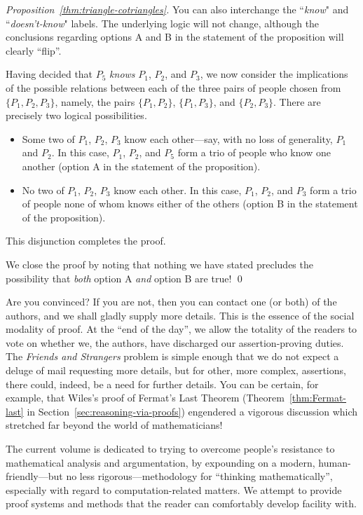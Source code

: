 \begin{proof}[Proposition~\ref{thm:triangle-cotriangles}]
{\begin{minipage}{0.96\textwidth}
You can also interchange the ``{\em know}" and ``{\em doesn't-know}" labels.  The underlying logic will not change, although the conclusions regarding options A and B in the statement of the proposition will clearly ``flip''.
\end{minipage} }

\bigskip

\noindent
Having decided that $P_5$ {\em knows} $P_1$, $P_2$, and $P_3$, we now consider the implications of the possible relations between each of the three pairs of people chosen from $\{P_1, P_2, P_3\}$, namely, the pairs  $\{P_1, P_2\}$, $\{P_1, P_3\}$, and $\{P_2, P_3\}$.  There
are precisely two logical possibilities.
\begin{itemize}
\item
Some two of $P_1$, $P_2$, $P_3$ know each other---say, with no loss of generality, $P_1$ and $P_2$.  In this case, $P_1$, $P_2$, and $P_5$ form a trio of people who know one another (option A in the statement of the proposition).
\item
No two of $P_1$, $P_2$, $P_3$ know each other.  In this case, $P_1$, $P_2$, and $P_3$ form a trio of people none of whom knows either of the others (option B in the statement of the proposition).
\end{itemize}
This disjunction completes the proof.

\smallskip

We close the proof by noting that nothing we have stated precludes the possibility that {\em both} option A {\em and} option B are true!  \qed
\end{proof}

Are you convinced?  If you are not, then you can contact one (or both) of the authors, and we shall gladly supply more details.  This is the essence of the social modality of proof.  At the ``end of the day'', we allow the totality of the readers to vote on whether we, the authors, have discharged our assertion-proving duties.  The {\it Friends and Strangers} problem is simple enough that we do not expect a deluge of mail requesting more details, but for other, more complex, assertions, there could, indeed, be a need for further details.  You can be certain, for example, that Wiles's proof of Fermat's Last Theorem (Theorem~\ref{thm:Fermat-last} in Section~\ref{sec:reasoning-via-proofs}) engendered a vigorous discussion which stretched far beyond the world of mathematicians!

\bigskip

The current volume is dedicated to trying to overcome people's resistance to mathematical analysis and argumentation, by expounding on a modern, human-friendly---but no less rigorous---methodology for ``thinking mathematically'', especially with regard to computation-related matters.  We attempt to provide proof systems and methods that the reader can
comfortably develop facility with.

